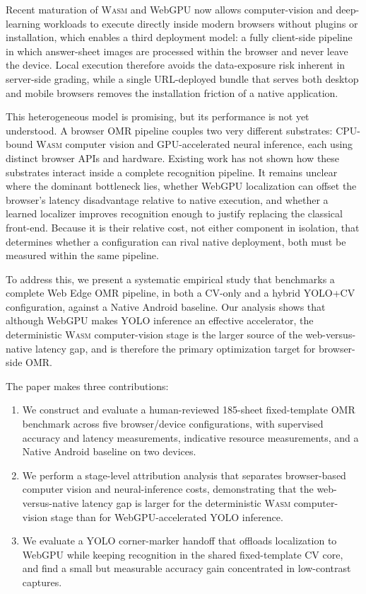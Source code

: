 \documentclass[conference]{IEEEtran}
\newcommand{\wasm}{\textnormal{\textsc{Wasm}}}
\begin{document}
Recent maturation of \wasm{} and WebGPU now allows computer-vision and
deep-learning workloads to execute directly inside modern browsers
without plugins or installation, which enables a third deployment model:
a fully client-side pipeline in which answer-sheet images are processed
within the browser and never leave the device. Local execution therefore avoids the data-exposure risk inherent in server-side
grading, while a single URL-deployed bundle that serves both desktop and mobile
browsers removes the installation friction of a native application.

This heterogeneous model is promising, but its performance is not yet
understood. A browser OMR pipeline couples two very different substrates:
CPU-bound \wasm{} computer vision and GPU-accelerated neural inference, each
using distinct browser APIs and hardware. Existing work has not shown how these substrates interact inside a complete
recognition pipeline. It remains unclear where the dominant bottleneck lies,
whether WebGPU localization can offset the browser's latency disadvantage
relative to native execution, and whether a learned localizer improves
recognition enough to justify replacing the classical front-end. Because it is their relative cost,
not either component in isolation, that determines whether a configuration can
rival native deployment, both must be measured within the same pipeline.

To address this, we present a systematic empirical study that benchmarks a
complete Web Edge OMR pipeline, in both a CV-only and a hybrid YOLO+CV
configuration, against a Native Android baseline. Our analysis shows that although WebGPU makes YOLO inference an effective
accelerator, the deterministic \wasm{} computer-vision stage is the larger
source of the web-versus-native latency gap, and is therefore the primary
optimization target for browser-side OMR.

The paper makes three contributions:
\begin{enumerate}[leftmargin=*, itemsep=1pt, topsep=2pt]
  \item We construct and evaluate a human-reviewed 185-sheet fixed-template OMR
benchmark across five browser/device configurations, with supervised accuracy
and latency measurements, indicative resource measurements, and a Native
Android baseline on two devices.
  \item We perform a stage-level attribution analysis that separates
  browser-based computer vision and neural-inference costs, demonstrating
  that the web-versus-native latency gap is larger for the deterministic
  \wasm{} computer-vision stage than for WebGPU-accelerated YOLO inference.
  \item We evaluate a YOLO corner-marker handoff that offloads localization to WebGPU
while keeping recognition in the shared fixed-template CV core, and find a
small but measurable accuracy gain concentrated in low-contrast captures.
\end{enumerate}
\end{document}
